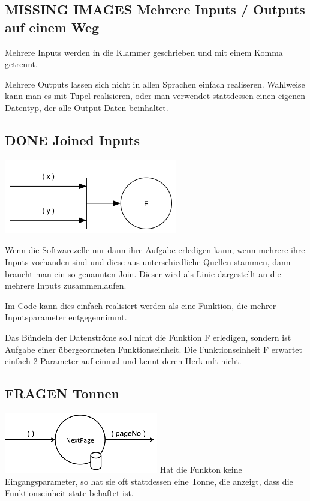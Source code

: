 \documentclass[11pt]{article}
\begin{document}
\subsection{{\bfseries\sffamily MISSING IMAGES} Mehrere Inputs / Outputs auf einem Weg}
\label{sec:orgheadline11}
Mehrere Inputs werden in die Klammer geschrieben und mit einem Komma getrennt.

Mehrere Outputs lassen sich nicht in allen Sprachen einfach realiseren.
Wahlweise kann man es mit Tupel realisieren, oder man verwendet stattdessen
einen eigenen Datentyp, der alle Output-Daten beinhaltet.

\subsection{{\bfseries\sffamily DONE} Joined Inputs}
\label{sec:orgheadline12}
\includegraphics[width=.9\linewidth]{./img/diagramJoin.png}

Wenn die Softwarezelle nur dann ihre Aufgabe erledigen kann, wenn mehrere ihre Inputs 
vorhanden sind und diese aus unterschiedliche Quellen stammen, dann braucht man ein so genannten Join.
Dieser wird als Linie dargestellt an die mehrere Inputs zusammenlaufen.

Im Code kann dies einfach realisiert werden als eine Funktion, die mehrer Inputsparameter entgegennimmt.

Das Bündeln der Datenströme soll nicht die Funktion F erledigen, sondern ist Aufgabe einer übergeordneten Funktionseinheit.
Die Funktionseinheit F erwartet einfach 2 Parameter auf einmal und kennt deren Herkunft nicht. 

\subsection{{\bfseries\sffamily FRAGEN} Tonnen}
\label{sec:orgheadline13}

\includegraphics[width=.9\linewidth]{./img/diagramTonne.png}
Hat die Funkton keine Eingangsparameter, so hat sie oft stattdessen eine Tonne, die anzeigt, dass die Funktionseinheit state-behaftet ist.
\end{document}
